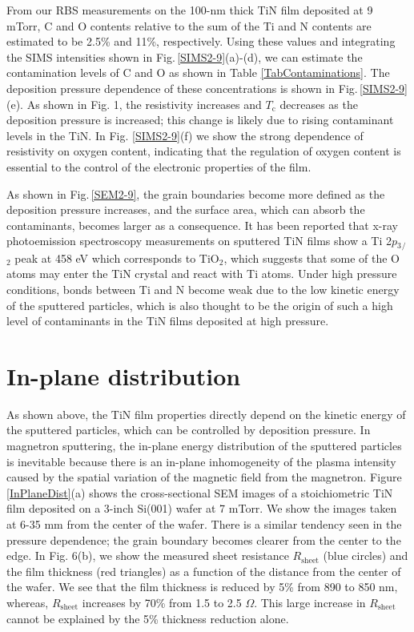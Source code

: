 From our RBS measurements on the 100-nm thick TiN film deposited at 9 mTorr, C and O contents relative to the sum of the Ti and N contents are estimated to be 2.5\% and 11\%, respectively. Using these values and integrating the SIMS intensities shown in Fig.\,\ref{SIMS2-9}(a)-(d), we can estimate the contamination levels of C and O as shown in Table \ref{TabContaminations}. The deposition pressure dependence of these concentrations is shown in Fig.\,\ref{SIMS2-9}(e). As shown in Fig. 1, the resistivity increases and $T{_\text{c}}$ decreases as the deposition pressure is increased; this change is likely due to rising contaminant levels in the TiN.  In Fig. \ref{SIMS2-9}(f) we show the strong dependence of resistivity on oxygen content, indicating that the regulation of oxygen content is essential to the control of the electronic properties of the film.

As shown in Fig.\,\ref{SEM2-9}, the grain boundaries become more defined as the deposition pressure increases, and the surface area, which can absorb the contaminants, becomes larger as a consequence. It has been reported that x-ray photoemission spectroscopy measurements on sputtered TiN films show a Ti 2$p{_3}$${_\slash}$${_2}$ peak at 458 eV which corresponds to TiO$_{2}$,\cite{Logothetidis1999} which suggests that some of the O atoms may enter the TiN crystal and react with Ti atoms. Under high pressure conditions, bonds between Ti and N become weak due to the low kinetic energy of the sputtered particles, which is also thought to be the origin of such a high level of contaminants in the TiN films deposited at high pressure.

\section{In-plane distribution}
\label{IN-PLANE DISTRIBUTION}

As shown above, the TiN film properties directly depend on the kinetic energy of the sputtered particles, which can be controlled by deposition pressure. In magnetron sputtering, the in-plane energy distribution of the sputtered particles is inevitable because there is an in-plane inhomogeneity of the plasma intensity caused by the spatial variation of the magnetic field from the magnetron. Figure \,\ref{InPlaneDist}(a) shows the cross-sectional SEM images of a stoichiometric TiN film deposited on a 3-inch Si(001) wafer at 7 mTorr. We show the images taken at 6-35 mm from the center of the wafer. There is a similar tendency seen in the pressure dependence; the grain boundary becomes clearer from the center to the edge. In Fig. 6(b), we show the measured sheet resistance $R$$_{\text{sheet}}$ (blue circles) and the film thickness (red triangles) as a function of the distance from the center of the wafer. We see that the film thickness is reduced by 5\% from 890 to 850 nm, whereas, $R$$_{\text{sheet}}$ increases by 70\% from 1.5 to 2.5 $\Omega$. This large increase in $R$$_{\text{sheet}}$ cannot be explained by the 5\% thickness reduction alone.

